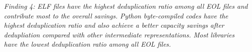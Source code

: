 \textit{Finding 4: ELF files have the highest deduplication ratio among all EOL
files and contribute most to the overall savings. Python byte-compiled codes
have the highest deduplication ratio and also achieve a better capacity savings
after dedupliation compared with other intermediate representations. Most
libraries have the lowest deduplication ratio among all EOL files.}
%
%
%
%
%
